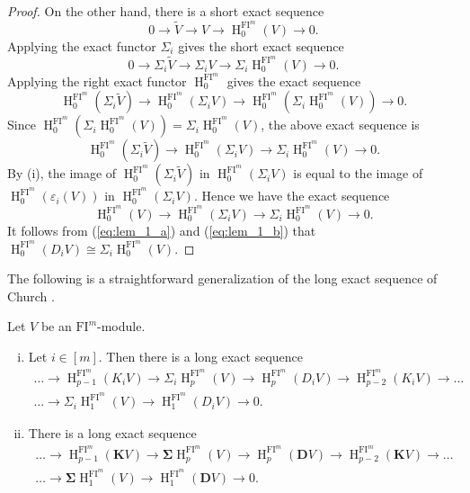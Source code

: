 \documentclass{amsart}
\numberwithin{equation}{section}
\DeclareMathOperator{\HH}{H}
\newcommand{\FI}{{\mathrm{FI}}}
\begin{document}
\begin{proof}
On the other hand, there is a short exact sequence 
\[ 0 \to \widetilde{V} \to V \to \HH^{\FI^m}_0(V) \to 0. \]
Applying the exact functor $\Sigma_i$ gives the short exact sequence
\[ 0 \to \Sigma_i\widetilde{V} \to \Sigma_iV \to \Sigma_i\HH^{\FI^m}_0(V) \to 0. \] 
Applying the right exact functor $\HH^{\FI^m}_0$ gives the exact sequence 
\[ \HH^{\FI^m}_0(\Sigma_i\widetilde{V}) \to \HH^{\FI^m}_0(\Sigma_iV) \to \HH^{\FI^m}_0( \Sigma_i\HH^{\FI^m}_0(V) )\to 0. \]
Since $\HH^{\FI^m}_0(\Sigma_i\HH^{\FI^m}_0(V))=\Sigma_i\HH^{\FI^m}_0(V)$, the above exact sequence is
\[ \HH^{\FI^m}_0(\Sigma_i\widetilde{V}) \to \HH^{\FI^m}_0(\Sigma_iV) \to \Sigma_i\HH^{\FI^m}_0(V) \to 0. \]
By (i), the image of $ \HH^{\FI^m}_0(\Sigma_i\widetilde{V})$ in $\HH^{\FI^m}_0(\Sigma_iV)$ is equal to the image of $\HH^{\FI^m}_0(\varepsilon_i(V))$ in $\HH^{\FI^m}_0(\Sigma_iV)$. Hence we have the exact sequence 
\begin{equation} \label{eq:lem_1_b}
   \HH^{\FI^m}_0 (V) \to \HH^{\FI^m}_0 (\Sigma_i V) \to \Sigma_i\HH^{\FI^m}_0(V) \to 0. 
\end{equation}
It follows from (\ref{eq:lem_1_a}) and (\ref{eq:lem_1_b}) that $ \HH^{\FI^m}_0 (D_i V) \cong \Sigma_i\HH^{\FI^m}_0(V)$.
\end{proof}



The following is a straightforward generalization of the long exact sequence of Church \cite{church}.

\begin{theorem} \label{church_les}
   Let $V$ be an $\FI^m$-module.
   \begin{enumerate}[(i)]
      \item Let $i\in [m]$. Then there is a long exact sequence 
      \begin{multline*}
         \ldots \to \HH^{\FI^m}_{p-1} (K_iV) \to \Sigma_i \HH^{\FI^m}_p (V) \to \HH^{\FI^m}_p (D_iV) \to 
         \HH^{\FI^m}_{p-2} (K_iV) \to \ldots \\
         \ldots \to \Sigma_i \HH^{\FI^m}_1 (V) \to \HH^{\FI^m}_1 (D_iV) \to 0.
      \end{multline*}
      \item There is a long exact sequence
      \begin{multline*}
         \ldots \to \HH^{\FI^m}_{p-1} (\mathbf{K}V) \to \mathbf{\Sigma} \HH^{\FI^m}_p (V) \to \HH^{\FI^m}_p (\mathbf{D}V) \to 
         \HH^{\FI^m}_{p-2} (\mathbf{K}V) \to \ldots \\
         \ldots \to \mathbf{\Sigma} \HH^{\FI^m}_1 (V) \to \HH^{\FI^m}_1 (\mathbf{D}V) \to 0.
      \end{multline*}
   \end{enumerate}
\end{theorem}
\end{document}
